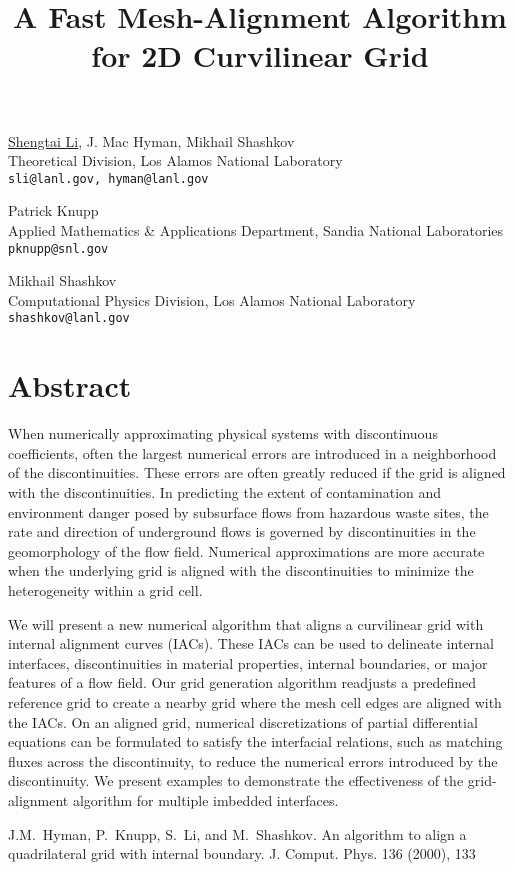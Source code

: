 \title{A Fast Mesh-Alignment Algorithm for 2D Curvilinear Grid}
\author{} \institute{}
\maketitle

\begin{center}
{\large \underline{Shengtai Li}, J. Mac Hyman, Mikhail Shashkov}\\
Theoretical Division, Los Alamos National Laboratory\\
{\tt sli@lanl.gov, hyman@lanl.gov}\\
\vspace{4mm}

{\large Patrick Knupp} \\
Applied Mathematics \& Applications Department, Sandia National Laboratories\\
{\tt pknupp@snl.gov}\\
\vspace{4mm}

{\large Mikhail Shashkov} \\
Computational Physics Division, Los Alamos National Laboratory\\ 
{\tt shashkov@lanl.gov}
\end{center}

\section*{Abstract}
When numerically approximating physical systems with discontinuous coefficients, often the largest numerical errors are introduced in a neighborhood of the discontinuities. These errors are often greatly reduced if the grid is aligned with the discontinuities. In predicting the extent of contamination and environment danger posed by subsurface flows from hazardous waste sites, the rate and direction of underground flows is governed by discontinuities in the geomorphology of the flow field.  Numerical approximations are more accurate when the underlying grid is  aligned with the discontinuities to minimize the heterogeneity  within a grid cell.

We will present a new numerical algorithm that aligns a curvilinear grid with internal alignment curves (IACs).  These IACs can be used to delineate internal interfaces, discontinuities in material properties, internal boundaries, or major features of a flow field. Our grid generation algorithm readjusts a predefined reference grid to create a nearby grid where the mesh cell edges are aligned with the IACs.  On an aligned grid, numerical discretizations of partial differential
equations can be formulated to satisfy the interfacial relations, such as matching fluxes across the discontinuity, to  reduce the numerical errors introduced by the discontinuity.  We present  examples to demonstrate the effectiveness of the grid-alignment algorithm for multiple imbedded interfaces.   


\begin{thebibliography}{10}
{\sc J.M.~Hyman, P.~Knupp, S.~Li, and M.~Shashkov}. {An algorithm to align a quadrilateral grid with internal boundary}. J. Comput. Phys. 136 (2000),  133
\end{thebibliography}